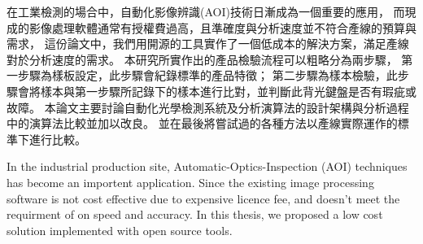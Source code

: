\begin{abstractzh}
在工業檢測的場合中，自動化影像辨識(AOI)技術日漸成為一個重要的應用，
而現成的影像處理軟體通常有授權費過高，且準確度與分析速度並不符合產線的預算與需求，
這份論文中，我們用開源的工具實作了一個低成本的解決方案，滿足產線對於分析速度的需求。
本研究所實作出的產品檢驗流程可以粗略分為兩步驟，
第一步驟為樣板設定，此步驟會紀錄標準的產品特徵；
第二步驟為樣本檢驗，此步驟會將樣本與第一步驟所記錄下的樣本進行比對，並判斷此背光鍵盤是否有瑕疵或故障。
本論文主要討論自動化光學檢測系統及分析演算法的設計架構與分析過程中的演算法比較並加以改良。
並在最後將嘗試過的各種方法以產線實際運作的標準下進行比較。

\end{abstractzh}

\begin{abstracten}
In the industrial production site, Automatic-Optics-Inspection (AOI) techniques has become an importent application.
Since the existing image processing software is not cost effective due to expensive licence fee, 
and doesn't meet the requirment of on speed and accuracy. 
In this thesis, we proposed a low cost solution implemented with open source tools.
\end{abstracten}